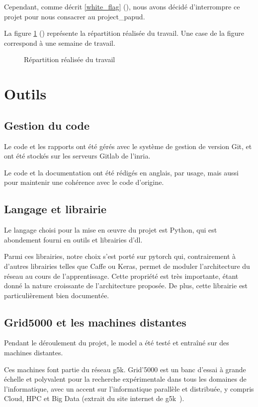 Cependant, comme décrit \autoref{white_flag} (), nous avons décidé d'interrompre ce projet pour nous consacrer au \gls{project_papud}.

La figure \ref{fig:gmsnn_time_2} () représente la répartition réalisée du travail. Une case de la figure correspond à une semaine de travail.

\begin{figure}[H]
	\centering
	\caption{Répartition réalisée du travail}\label{fig:gmsnn_time_2}
\end{figure}

\section{Outils}
\subsection{Gestion du code} \label{subsec:code_gmsnn}
Le code et les rapports ont été gérés avec le système de gestion de version Git, et ont été stockés sur les serveurs Gitlab de l'\gls{inria}.

Le code et la documentation ont été rédigés en anglais, par usage, mais aussi pour maintenir une cohérence avec le code d'origine.

\subsection{Langage et librairie}
Le langage choisi pour la mise en œuvre du projet est Python, qui est abondement fourni en outils et librairies d'\gls{dl}.

Parmi ces librairies, notre choix s'est porté sur \gls{pytorch} qui, contrairement à d'autres librairies telles que Caffe ou Keras, permet de moduler l'architecture du réseau au cours de l'apprentissage. Cette propriété est très importante, étant donné la nature \og croissante\fg{} de l'architecture proposée. De plus, cette librairie est particulièrement bien documentée.

\subsection{Grid5000 et les machines distantes}
Pendant le déroulement du projet, le \gls{model} a été testé et entraîné sur des machines distantes.

Ces machines font partie du réseau \gls{g5k}.
\og Grid'5000 est un banc d'essai à grande échelle et polyvalent pour la recherche expérimentale dans tous les domaines de l'informatique, avec un accent sur l'informatique parallèle et distribuée, y compris Cloud, HPC et Big Data\fg{} (extrait du site internet de \gls{g5k}~\autocite{g5k}).


